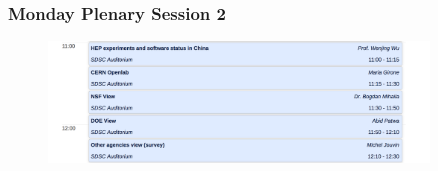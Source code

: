 \begin{frame}
\frametitle{Monday Plenary Session 2}

\begin{figure}[htbp]
\begin{center}
\includegraphics[width=0.9\textwidth]{images/hsf-sdsc-monday2.png}
\end{center}
\end{figure}


\end{frame}


